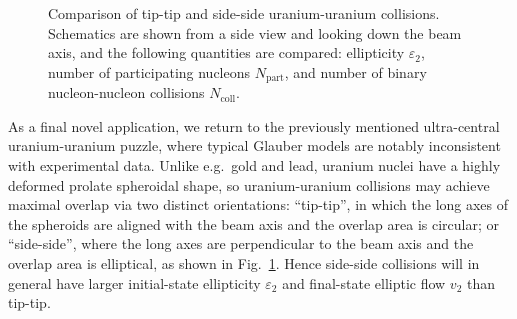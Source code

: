 \documentclass[aps,prc,reprint,amsmath,noeprint]{revtex4-1}
\begin{document}
\begin{figure}[b]
  \caption{
    \label{fig:uu-schematic}
    Comparison of tip-tip and side-side uranium-uranium collisions.
    Schematics are shown from a side view and looking down the beam axis, and the following quantities are compared:
    ellipticity $\varepsilon_2$, number of participating nucleons $N_\text{part}$, and number of binary nucleon-nucleon collisions $N_\text{coll}$.
  }
\end{figure}

As a final novel application, we return to the previously mentioned ultra-central uranium-uranium puzzle, where typical Glauber models are notably inconsistent with experimental data.
Unlike e.g.~gold and lead, uranium nuclei have a highly deformed prolate spheroidal shape, so uranium-uranium collisions may achieve maximal overlap via two distinct orientations:
``tip-tip'', in which the long axes of the spheroids are aligned with the beam axis and the overlap area is circular;
or ``side-side'', where the long axes are perpendicular to the beam axis and the overlap area is elliptical, as shown in Fig.~\ref{fig:uu-schematic}.
Hence side-side collisions will in general have larger initial-state ellipticity $\varepsilon_2$ and final-state elliptic flow $v_2$ than tip-tip.
\end{document}
